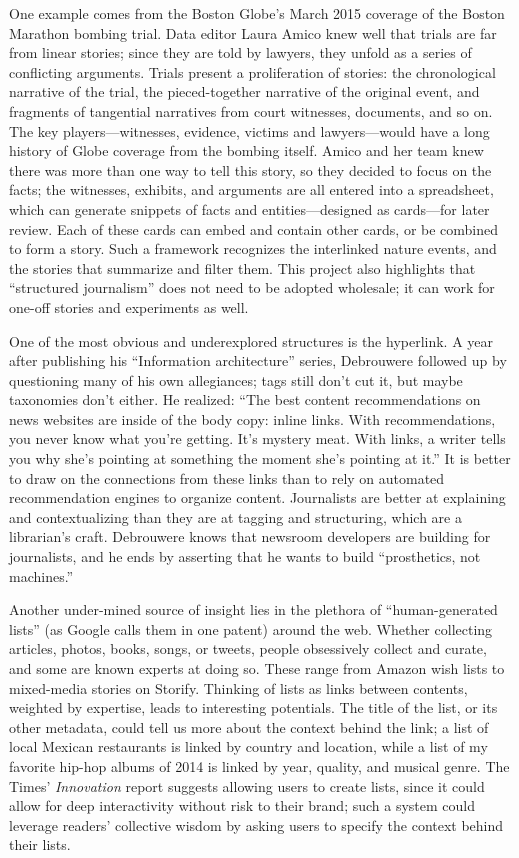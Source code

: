 One example comes from the Boston Globe's March 2015 coverage of the Boston Marathon bombing trial. Data editor Laura Amico knew well that trials are far from linear stories; since they are told by lawyers, they unfold as a series of conflicting arguments. Trials present a proliferation of stories: the chronological narrative of the trial, the pieced-together narrative of the original event, and fragments of tangential narratives from court witnesses, documents, and so on. The key players---witnesses, evidence, victims and lawyers---would have a long history of Globe coverage from the bombing itself. Amico and her team knew there was more than one way to tell this story, so they decided to focus on the facts; the witnesses, exhibits, and arguments are all entered into a spreadsheet, which can generate snippets of facts and entities---designed as cards---for later review.\autocite{mullin_how_2015} Each of these cards can embed and contain other cards, or be combined to form a story. Such a framework recognizes the interlinked nature events, and the stories that summarize and filter them. This project also highlights that ``structured journalism'' does not need to be adopted wholesale; it can work for one-off stories and experiments as well.

One of the most obvious and underexplored structures is the hyperlink. A year after publishing his ``Information architecture'' series, Debrouwere followed up by questioning many of his own allegiances; tags still don't cut it, but maybe taxonomies don't either. He realized: ``The best content recommendations on news websites are inside of the body copy: inline links. With recommendations, you never know what you're getting. It's mystery meat. With links, a writer tells you why she's pointing at something the moment she's pointing at it.''\autocite{debrouwere_taxonomies_2011} It is better to draw on the connections from these links than to rely on automated recommendation engines to organize content. Journalists are better at explaining and contextualizing than they are at tagging and structuring, which are a librarian's craft. Debrouwere knows that newsroom developers are building for journalists, and he ends by asserting that he wants to build ``prosthetics, not machines.''

Another under-mined source of insight lies in the plethora of ``human-generated lists'' (as Google calls them in one patent) around the web.\autocite{franks_discovering_2012} Whether collecting articles, photos, books, songs, or tweets, people obsessively collect and curate, and some are known experts at doing so. These range from Amazon wish lists to mixed-media stories on Storify. Thinking of lists as links between contents, weighted by expertise, leads to interesting potentials. The title of the list, or its other metadata, could tell us more about the context behind the link; a list of local Mexican restaurants is linked by country and location, while a list of my favorite hip-hop albums of 2014 is linked by year, quality, and musical genre. The Times' \emph{Innovation} report suggests allowing users to create lists, since it could allow for deep interactivity without risk to their brand; such a system could leverage readers' collective wisdom by asking users to specify the context behind their lists.

